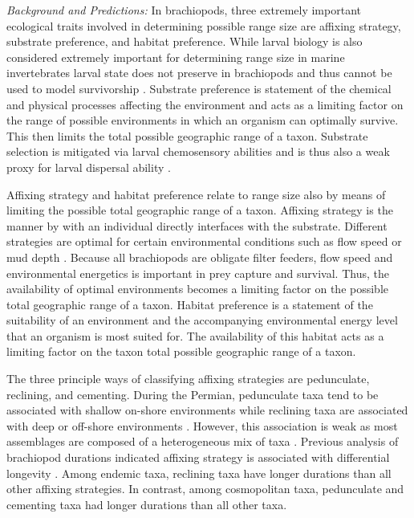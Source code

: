 \documentclass[12pt,letterpaper]{article}
\begin{document}
\textit{Background and Predictions:}
In brachiopods, three extremely important ecological traits involved in determining possible range size are affixing strategy, substrate preference, and habitat preference. While larval biology is also considered extremely important for determining range size in marine invertebrates \citep{Jablonski2006a,Jablonski1983} larval state does not preserve in brachiopods and thus cannot be used to model survivorship \citep{Jablonski1983}. Substrate preference is statement of the chemical and physical processes affecting the environment and acts as a limiting factor on the range of possible environments in which an organism can optimally survive. This then limits the total possible geographic range of a taxon. Substrate selection is mitigated via larval chemosensory abilities and is thus also a weak proxy for larval dispersal ability \citep{Jablonski2006a,Jablonski1983}. 

Affixing strategy and habitat preference relate to range size also by means of limiting the possible total geographic range of a taxon. Affixing strategy is the manner by with an individual directly interfaces with the substrate. Different strategies are optimal for certain environmental conditions such as flow speed or mud depth \citep{Alexander1977,LaBarbera1978,LaBarbera1981}. Because all brachiopods are obligate filter feeders, flow speed and environmental energetics is important in prey capture and survival. Thus, the availability of optimal environments becomes a limiting factor on the possible total geographic range of a taxon. Habitat preference is a statement of the suitability of an environment and the accompanying environmental energy level that an organism is most suited for. The availability of this habitat acts as a limiting factor on the taxon total possible geographic range of a taxon. 

The three principle ways of classifying affixing strategies are pedunculate, reclining, and cementing. During the Permian, pedunculate taxa tend to be associated with shallow on-shore environments while reclining taxa are associated with deep or off-shore environments \citep{Clapham2007}. However, this association is weak as most assemblages are composed of a heterogeneous mix of taxa \citep{Clapham2007}. Previous analysis of brachiopod durations indicated affixing strategy is associated with differential longevity \citep{Alexander1977}. Among endemic taxa, reclining taxa have longer durations than all other affixing strategies. In contrast, among cosmopolitan taxa, pedunculate and cementing taxa had longer durations than all other taxa. 
\end{document}
